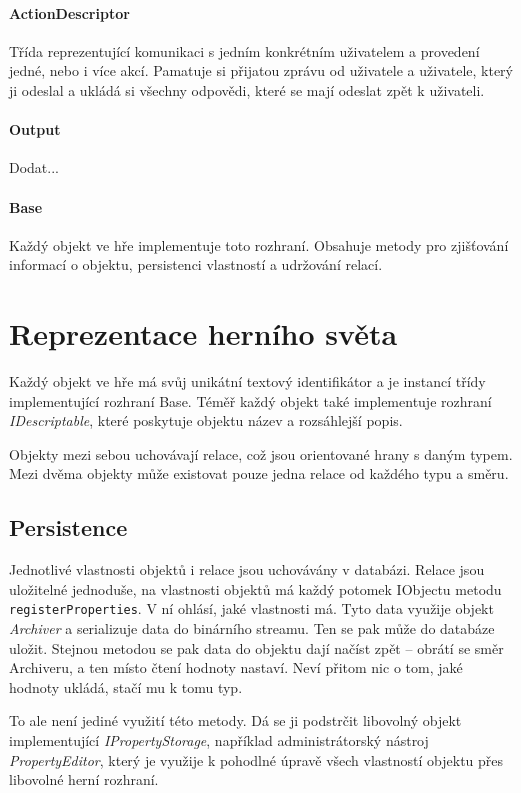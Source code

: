 \documentclass[11pt, a4paper]{article}
\def\class#1{\emph{#1}}
\begin{document}
\paragraph{ActionDescriptor} Třída reprezentující komunikaci s jedním konkrétním uživatelem a provedení jedné, nebo i více akcí. Pamatuje si přijatou zprávu od uživatele a uživatele, který ji odeslal a ukládá si všechny odpovědi, které se mají odeslat zpět k uživateli.

\paragraph{Output} Dodat...

\paragraph{Base} Každý objekt ve hře implementuje toto rozhraní. Obsahuje metody pro zjišťování informací o objektu, persistenci vlastností a udržování relací.

\section{Reprezentace herního světa}

Každý objekt ve hře má svůj unikátní textový identifikátor a je instancí třídy implementující rozhraní Base. Téměř každý objekt také implementuje rozhraní \class{IDescriptable}, které poskytuje objektu název a rozsáhlejší popis. 

Objekty mezi sebou uchovávají relace, což jsou orientované hrany s daným typem. Mezi dvěma objekty může existovat pouze jedna relace od každého typu a směru.

\subsection{Persistence}

Jednotlivé vlastnosti objektů i relace jsou uchovávány v databázi. Relace jsou uložitelné jednoduše, na vlastnosti objektů má každý potomek IObjectu metodu \texttt{registerProperties}. V ní ohlásí, jaké vlastnosti má. Tyto data využije objekt \class{Archiver} a serializuje data do binárního streamu. Ten se pak může do databáze uložit. Stejnou metodou se pak data do objektu dají načíst zpět -- obrátí se směr Archiveru, a ten místo čtení hodnoty nastaví. Neví přitom nic o tom, jaké hodnoty ukládá, stačí mu k tomu typ.

To ale není jediné využití této metody. Dá se ji podstrčit libovolný objekt implementující \class{IPropertyStorage}, například administrátorský nástroj \class{PropertyEditor}, který je využije k pohodlné úpravě všech vlastností objektu přes libovolné herní rozhraní.
\end{document}

